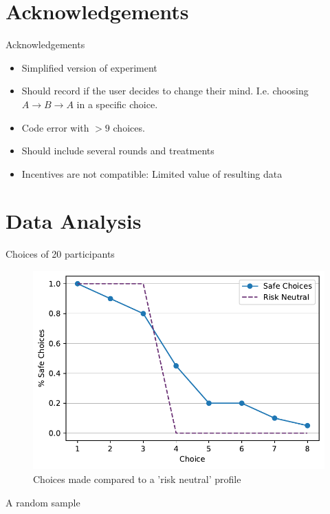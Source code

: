 \documentclass[10pt]{beamer}
\begin{document}
\section{Acknowledgements}
\begin{frame}[fragile]{Acknowledgements}
  \begin{itemize}
    \item Simplified version of experiment
    \item Should record if the user decides to change their mind. I.e. choosing $A \rightarrow B \rightarrow A$ in a specific choice. 
    \item Code error with $> 9$ choices.
    \item Should include several rounds and treatments
    \item Incentives are not compatible: Limited value of resulting data
  \end{itemize}
\end{frame}

\section{Data Analysis}

\begin{frame}{Choices of 20 participants}
  \begin{figure}[H]
  \includegraphics[width=0.9\columnwidth]{graphics/aggregate_plot.pdf}
  \caption{Choices made compared to a 'risk neutral' profile}
\end{figure}
\end{frame}


\begin{frame}{A random sample}
  \resizebox{\textwidth}{!}{
    
  }
\end{frame}
\end{document}
